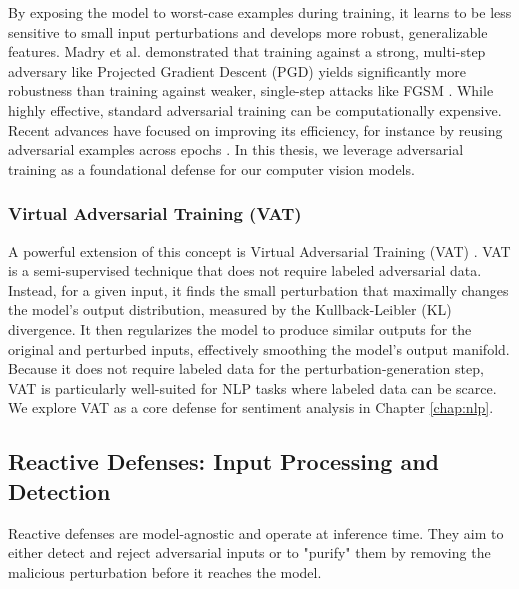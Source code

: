 \documentclass[../main.tex]{subfiles}
\begin{document}
By exposing the model to worst-case examples during training, it learns to be less sensitive to small input perturbations and develops more robust, generalizable features. Madry et al. demonstrated that training against a strong, multi-step adversary like Projected Gradient Descent (PGD) yields significantly more robustness than training against weaker, single-step attacks like FGSM \cite{madry2018towardspgd}. While highly effective, standard adversarial training can be computationally expensive. Recent advances have focused on improving its efficiency, for instance by reusing adversarial examples across epochs \cite{zheng2020efficientadversarialtrainingtransferable}. In this thesis, we leverage adversarial training as a foundational defense for our computer vision models.

\subsubsection{Virtual Adversarial Training (VAT)}
A powerful extension of this concept is Virtual Adversarial Training (VAT) \cite{miyato2017virtual}. VAT is a semi-supervised technique that does not require labeled adversarial data. Instead, for a given input, it finds the small perturbation that maximally changes the model's output distribution, measured by the Kullback-Leibler (KL) divergence. It then regularizes the model to produce similar outputs for the original and perturbed inputs, effectively smoothing the model's output manifold. Because it does not require labeled data for the perturbation-generation step, VAT is particularly well-suited for NLP tasks where labeled data can be scarce. We explore VAT as a core defense for sentiment analysis in Chapter \ref{chap:nlp}.

\subsection{Reactive Defenses: Input Processing and Detection}
Reactive defenses are model-agnostic and operate at inference time. They aim to either detect and reject adversarial inputs or to "purify" them by removing the malicious perturbation before it reaches the model.
\end{document}
